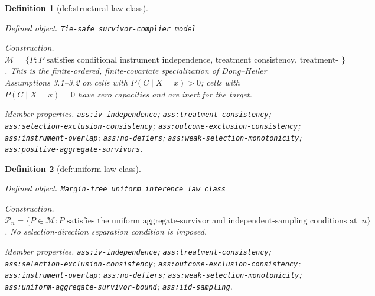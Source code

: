 \documentclass{article}
\newtheorem{definition}{Definition}
\begin{document}
\begin{definition}[def:structural-law-class]\label{def:structural-law-class}
\par\smallskip\noindent\emph{Defined object.} \texttt{Tie-\allowbreak{}safe survivor-\allowbreak{}complier model}
\par\smallskip\noindent\emph{Construction.} \(\mathcal M=\{P:P\text{ satisfies conditional instrument independence, treatment consistency, treatment-mediated selection and outcome exclusion, instrument overlap, no defiers, latent-direction weak selection monotonicity, and positive aggregate survivor-complier mass}\}\).  This is the finite-ordered, finite-covariate specialization of Dong--Heiler Assumptions 3.1--3.2 on cells with \(P(C\mid X=x)>0\); cells with \(P(C\mid X=x)=0\) have zero capacities and are inert for the target.
\par\smallskip\noindent\emph{Member properties.} \texttt{ass:\allowbreak{}iv-\allowbreak{}independence}; \texttt{ass:\allowbreak{}treatment-\allowbreak{}consistency}; \texttt{ass:\allowbreak{}selection-\allowbreak{}exclusion-\allowbreak{}consistency}; \texttt{ass:\allowbreak{}outcome-\allowbreak{}exclusion-\allowbreak{}consistency}; \texttt{ass:\allowbreak{}instrument-\allowbreak{}overlap}; \texttt{ass:\allowbreak{}no-\allowbreak{}defiers}; \texttt{ass:\allowbreak{}weak-\allowbreak{}selection-\allowbreak{}monotonicity}; \texttt{ass:\allowbreak{}positive-\allowbreak{}aggregate-\allowbreak{}survivors}.
\end{definition}

\begin{definition}[def:uniform-law-class]\label{def:uniform-law-class}
\par\smallskip\noindent\emph{Defined object.} \texttt{Margin-\allowbreak{}free uniform inference law class}
\par\smallskip\noindent\emph{Construction.} \(\mathcal P_n=\{P\in\mathcal M:P\text{ satisfies the uniform aggregate-survivor and independent-sampling conditions at index }n\}\).  No selection-direction separation condition is imposed.
\par\smallskip\noindent\emph{Member properties.} \texttt{ass:\allowbreak{}iv-\allowbreak{}independence}; \texttt{ass:\allowbreak{}treatment-\allowbreak{}consistency}; \texttt{ass:\allowbreak{}selection-\allowbreak{}exclusion-\allowbreak{}consistency}; \texttt{ass:\allowbreak{}outcome-\allowbreak{}exclusion-\allowbreak{}consistency}; \texttt{ass:\allowbreak{}instrument-\allowbreak{}overlap}; \texttt{ass:\allowbreak{}no-\allowbreak{}defiers}; \texttt{ass:\allowbreak{}weak-\allowbreak{}selection-\allowbreak{}monotonicity}; \texttt{ass:\allowbreak{}uniform-\allowbreak{}aggregate-\allowbreak{}survivor-\allowbreak{}bound}; \texttt{ass:\allowbreak{}iid-\allowbreak{}sampling}.
\end{definition}
\end{document}
